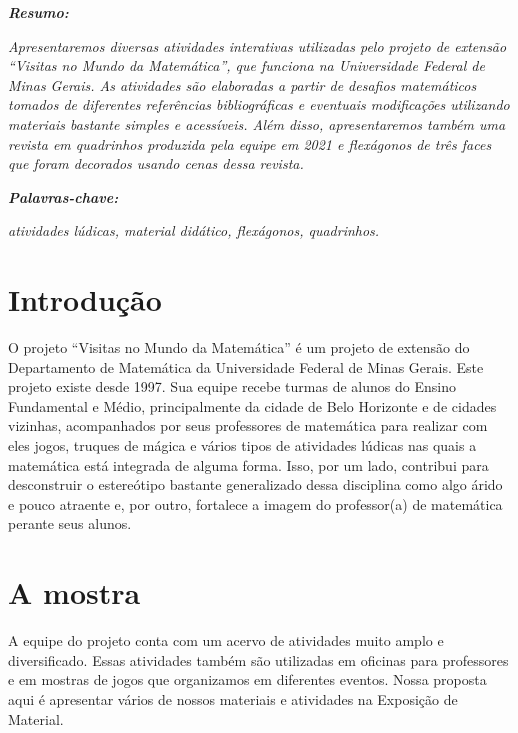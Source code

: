 \documentclass[12pt,oneside,a4paper]{article}
\begin{document}
\noindent \textit{\textbf{Resumo:}}{\it 
  Apresentaremos diversas atividades interativas utilizadas pelo projeto de extensão “Visitas no Mundo da Matemática”, que funciona na Universidade Federal de Minas Gerais. As atividades são elaboradas a partir de desafios matemáticos tomados de diferentes referências bibliográficas e eventuais modificações utilizando materiais bastante simples e acessíveis. Além disso, apresentaremos também uma revista em quadrinhos produzida pela equipe em 2021 e flexágonos de três faces que foram decorados usando cenas dessa revista.

}

\begin{flushleft}
\textit{\textbf{Palavras-chave:}}{\it
 atividades lúdicas, material didático, flexágonos, quadrinhos.

}\end{flushleft}

 






\section{Introdução}

O projeto “Visitas no Mundo da Matemática” é um projeto de extensão do Departamento de Matemática da Universidade Federal de Minas Gerais.  Este projeto existe desde 1997. Sua equipe recebe turmas de alunos do Ensino Fundamental e Médio, principalmente da cidade de Belo Horizonte e de cidades vizinhas, acompanhados por seus professores de matemática para realizar com eles jogos, truques de mágica e vários tipos de atividades lúdicas nas quais a matemática está integrada de alguma forma. Isso, por um lado, contribui para desconstruir o estereótipo bastante generalizado dessa disciplina como algo árido e pouco atraente e, por outro, fortalece a imagem do professor(a) de matemática perante seus alunos.

\section{A mostra}

A equipe do projeto conta com um acervo de atividades muito amplo e diversificado. Essas atividades também são utilizadas em oficinas para professores e em mostras de jogos que organizamos em diferentes eventos. Nossa proposta aqui é apresentar vários de nossos materiais e atividades na Exposição de Material.
\end{document}
